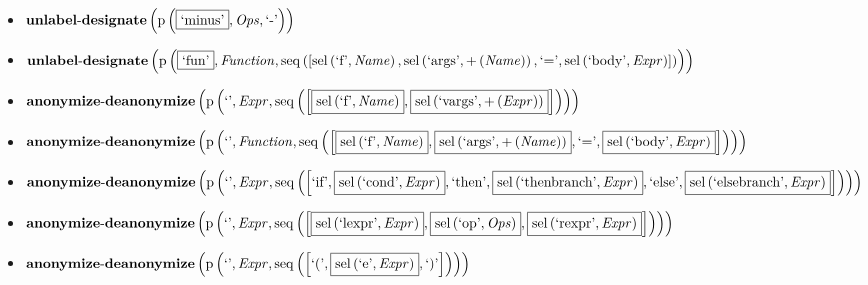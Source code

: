 {\begin{itemize}
\item $\mathbf{unlabel\text{-}designate}\\\left(\mathrm{p}\left(\fbox{\text{`minus'}},\mathit{Ops},\text{`-'}\right)\right)$
\item $\mathbf{unlabel\text{-}designate}\\\left(\mathrm{p}\left(\fbox{\text{`fun'}},\mathit{Function},\mathrm{seq}\left(\left[\mathrm{sel}\left(\text{`f'},\mathit{Name}\right), \mathrm{sel}\left(\text{`args'},{+}\left(\mathit{Name}\right)\right), \text{`='}, \mathrm{sel}\left(\text{`body'},\mathit{Expr}\right)\right]\right)\right)\right)$
\item $\mathbf{anonymize\text{-}deanonymize}\\\left(\mathrm{p}\left(\text{`'},\mathit{Expr},\mathrm{seq}\left(\left[\fbox{$\mathrm{sel}\left(\text{`f'},\mathit{Name}\right)$}, \fbox{$\mathrm{sel}\left(\text{`vargs'},{+}\left(\mathit{Expr}\right)\right)$}\right]\right)\right)\right)$
\item $\mathbf{anonymize\text{-}deanonymize}\\\left(\mathrm{p}\left(\text{`'},\mathit{Function},\mathrm{seq}\left(\left[\fbox{$\mathrm{sel}\left(\text{`f'},\mathit{Name}\right)$}, \fbox{$\mathrm{sel}\left(\text{`args'},{+}\left(\mathit{Name}\right)\right)$}, \text{`='}, \fbox{$\mathrm{sel}\left(\text{`body'},\mathit{Expr}\right)$}\right]\right)\right)\right)$
\item $\mathbf{anonymize\text{-}deanonymize}\\\left(\mathrm{p}\left(\text{`'},\mathit{Expr},\mathrm{seq}\left(\left[\text{`if'}, \fbox{$\mathrm{sel}\left(\text{`cond'},\mathit{Expr}\right)$}, \text{`then'}, \fbox{$\mathrm{sel}\left(\text{`thenbranch'},\mathit{Expr}\right)$}, \text{`else'}, \fbox{$\mathrm{sel}\left(\text{`elsebranch'},\mathit{Expr}\right)$}\right]\right)\right)\right)$
\item $\mathbf{anonymize\text{-}deanonymize}\\\left(\mathrm{p}\left(\text{`'},\mathit{Expr},\mathrm{seq}\left(\left[\fbox{$\mathrm{sel}\left(\text{`lexpr'},\mathit{Expr}\right)$}, \fbox{$\mathrm{sel}\left(\text{`op'},\mathit{Ops}\right)$}, \fbox{$\mathrm{sel}\left(\text{`rexpr'},\mathit{Expr}\right)$}\right]\right)\right)\right)$
\item $\mathbf{anonymize\text{-}deanonymize}\\\left(\mathrm{p}\left(\text{`'},\mathit{Expr},\mathrm{seq}\left(\left[\text{`('}, \fbox{$\mathrm{sel}\left(\text{`e'},\mathit{Expr}\right)$}, \text{`)'}\right]\right)\right)\right)$

\end{itemize}}

